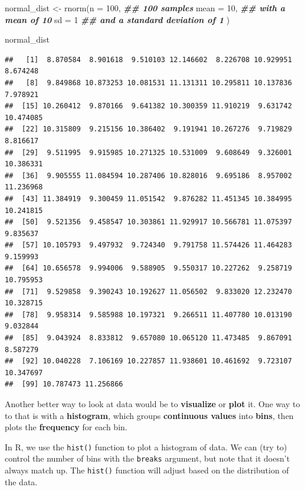 \documentclass[
]{book}
\newenvironment{Shaded}{\begin{snugshade}}{\end{snugshade}}
\newcommand{\AttributeTok}[1]{\textcolor[rgb]{0.77,0.63,0.00}{#1}}
\newcommand{\DecValTok}[1]{\textcolor[rgb]{0.00,0.00,0.81}{#1}}
\newcommand{\DocumentationTok}[1]{\textcolor[rgb]{0.56,0.35,0.01}{\textbf{\textit{#1}}}}
\newcommand{\FunctionTok}[1]{\textcolor[rgb]{0.00,0.00,0.00}{#1}}
\newcommand{\NormalTok}[1]{#1}
\newcommand{\OtherTok}[1]{\textcolor[rgb]{0.56,0.35,0.01}{#1}}
\begin{document}
\begin{Shaded}
\begin{Highlighting}[]
\NormalTok{normal\_dist }\OtherTok{\textless{}{-}} \FunctionTok{rnorm}\NormalTok{(}\AttributeTok{n =} \DecValTok{100}\NormalTok{, }\DocumentationTok{\#\# 100 samples}
                     \AttributeTok{mean =} \DecValTok{10}\NormalTok{, }\DocumentationTok{\#\# with a mean of 10}
                     \AttributeTok{sd =} \DecValTok{1} \DocumentationTok{\#\# and a standard deviation of 1}
\NormalTok{                     )}


\NormalTok{normal\_dist}
\end{Highlighting}
\end{Shaded}

\begin{verbatim}
##   [1]  8.870584  8.901618  9.510103 12.146602  8.226708 10.929951  8.674248
##   [8]  9.849868 10.873253 10.081531 11.131311 10.295811 10.137836  7.978921
##  [15] 10.260412  9.870166  9.641382 10.300359 11.910219  9.631742 10.474085
##  [22] 10.315809  9.215156 10.386402  9.191941 10.267276  9.719829  8.816617
##  [29]  9.511995  9.915985 10.271325 10.531009  9.608649  9.326001 10.386331
##  [36]  9.905555 11.084594 10.287406 10.828016  9.695186  8.957002 11.236968
##  [43] 11.384919  9.300459 11.051542  9.876282 11.451345 10.384995 10.241815
##  [50]  9.521356  9.458547 10.303861 11.929917 10.566781 11.075397  9.835637
##  [57] 10.105793  9.497932  9.724340  9.791758 11.574426 11.464283  9.159993
##  [64] 10.656578  9.994006  9.588905  9.550317 10.227262  9.258719 10.795953
##  [71]  9.529858  9.390243 10.192627 11.056502  9.833020 12.232470 10.328715
##  [78]  9.958314  9.585988 10.197321  9.266511 11.407780 10.013190  9.032844
##  [85]  9.043924  8.833812  9.657080 10.065120 11.473485  9.867091  8.587279
##  [92] 10.040228  7.106169 10.227857 11.938601 10.461692  9.723107 10.347697
##  [99] 10.787473 11.256866
\end{verbatim}

Another better way to look at data would be to \textbf{visualize} or \textbf{plot} it. One way to to that is with a \textbf{histogram}, which groups \textbf{continuous values} into \textbf{bins}, then plots the \textbf{frequency} for each bin.

In R, we use the \texttt{hist()} function to plot a histogram of data. We can (try to) control the number of bins with the \texttt{breaks} argument, but note that it doesn't always match up. The \texttt{hist()} function will adjust based on the distribution of the data.
\end{document}
